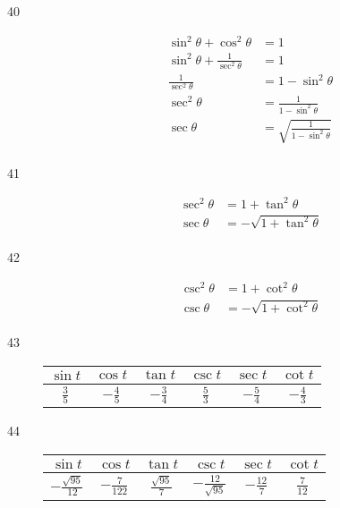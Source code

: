 \documentclass{exam}
\begin{document}
\begin{description}
      \item[40]
        \begin{align*}
          \sin^2 \theta + \cos^2 \theta           & = 1 \\
          \sin^2 \theta + \frac{1}{\sec^2 \theta} & = 1 \\
          \frac{1}{\sec^2 \theta}                 & = 1 - \sin^2 \theta \\
          \sec^2 \theta                           & = \frac{1}{1 - \sin^2 \theta} \\
          \sec \theta                             & = \boxed{ \sqrt{ \frac{1}{1 - \sin^2 \theta} } } \\
        \end{align*}

      \item[41]
        \begin{align*}
          \sec^2 \theta & = 1 + \tan^2 \theta \\
          \sec \theta   & = \boxed{ - \sqrt{ 1 + \tan^2 \theta } } \\
        \end{align*}

      \item[42]
        \begin{align*}
          \csc^2 \theta & = 1 + \cot^2 \theta \\
          \csc \theta   & = \boxed{ - \sqrt{ 1 + \cot^2 \theta } } \\
        \end{align*}

      \item[43]
        \begin{tabular}[H]{cccccc}
          \toprule
          $\sin t$      & $\cos t$        & $\tan t$        & $\csc t$      & $\sec t$        & $\cot t$ \\
          \midrule
          $\frac{3}{5}$ & $- \frac{4}{5}$ & $- \frac{3}{4}$ & $\frac{5}{3}$ & $- \frac{5}{4}$ & $- \frac{4}{3}$ \\
          \bottomrule
        \end{tabular}

      \item[44]
        \begin{tabular}[H]{cccccc}
          \toprule
          $\sin t$                & $\cos t$         & $\tan t$              & $\csc t$                & $\sec t$        & $\cot t$ \\
          \midrule
          $-\frac{\sqrt{95}}{12}$ & $-\frac{7}{122}$ & $\frac{\sqrt{95}}{7}$ & $-\frac{12}{\sqrt{95}}$ & $-\frac{12}{7}$ & $\frac{7}{12}$ \\
          \bottomrule
        \end{tabular}


\end{description}
\end{document}
